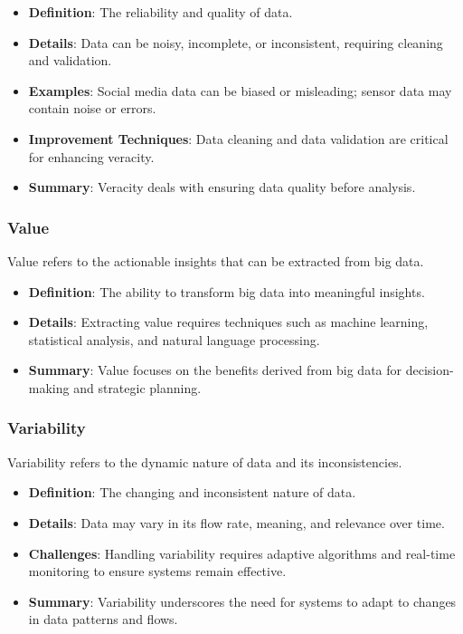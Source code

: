 \documentclass[12pt]{article}
\begin{document}
\begin{itemize}
    \item \textbf{Definition}: The reliability and quality of data.
    \item \textbf{Details}: Data can be noisy, incomplete, or inconsistent, requiring cleaning and validation.
    \item \textbf{Examples}: Social media data can be biased or misleading; sensor data may contain noise or errors.
    \item \textbf{Improvement Techniques}: Data cleaning and data validation are critical for enhancing veracity.
    \item \textbf{Summary}: Veracity deals with ensuring data quality before analysis.
\end{itemize}

\subsubsection{Value}
Value refers to the actionable insights that can be extracted from big data.

\begin{itemize}
    \item \textbf{Definition}: The ability to transform big data into meaningful insights.
    \item \textbf{Details}: Extracting value requires techniques such as machine learning, statistical analysis, and natural language processing.
    \item \textbf{Summary}: Value focuses on the benefits derived from big data for decision-making and strategic planning.
\end{itemize}

\subsubsection{Variability}
Variability refers to the dynamic nature of data and its inconsistencies.

\begin{itemize}
    \item \textbf{Definition}: The changing and inconsistent nature of data.
    \item \textbf{Details}: Data may vary in its flow rate, meaning, and relevance over time.
    \item \textbf{Challenges}: Handling variability requires adaptive algorithms and real-time monitoring to ensure systems remain effective.
    \item \textbf{Summary}: Variability underscores the need for systems to adapt to changes in data patterns and flows.
\end{itemize}
\end{document}

